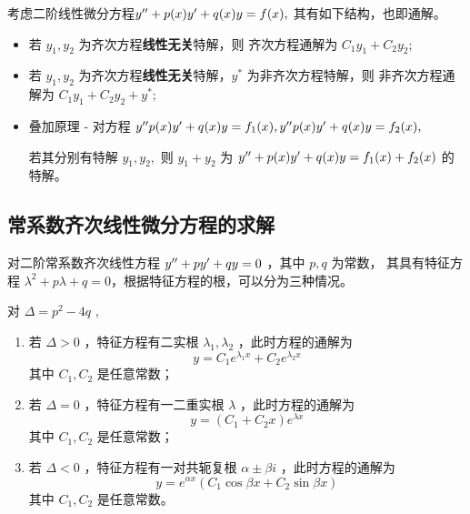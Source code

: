 考虑二阶线性微分方程$ y^{\prime\prime} + p(x)y' + q(x)y = f(x), $ 其有如下结构，也即通解。

\begin{itemize}
    \item 若 $ y_1,y_2 $ 为齐次方程\textbf{线性无关}特解，则
    齐次方程通解为 $ C_1y_1+C_2y_2; $ 
    \item 若 $ y_1,y_2 $ 为齐次方程\textbf{线性无关}特解，$ y^* $ 为非齐次方程特解，则
    非齐次方程通解为 $ C_1y_1+C_2y_2 + y^*; $ 
    \item 叠加原理 - 对方程 $ y^{\prime\prime} p(x)y'+q(x)y = f_1(x),y^{\prime\prime} p(x)y'+q(x)y = f_2(x), $
    
    若其分别有特解 $ y_1,y_2, $ 则 $ y_1+y_2 $ 为 $ y^{\prime\prime} +p(x)y'+q(x)y = f_1(x)+f_2(x) $ 的特解。
\end{itemize}

\begin{comment}
\begin{itemize}
    \item 对二阶齐次线性微分方程的两特解 $ y_1,y_2 $ ，其任意一组线性组合都是
    同一方程的特解；若两特解线性无关，其线性组合为通解；
    \item 若 $ y_1,y_2 $ 为二阶非齐次线性微分方程的两特解，
    则 $ y_1-y_2 $ 是对应齐次方程的一特解；
    \item 若 $ \hat y,y^* $ 分别为一二阶齐次线性微分方程以及与前者
    对应的非齐次方程的特解，则其和为对应非齐次方程的一特解；
    \item 若 $ \hat y,y^* $ 分别为一二阶齐次线性微分方程的通解以及与前者
    对应的非齐次方程的特解，则其和为对应非齐次方程的通解；
    \item 对方程 $ y^\pprime p_1(x)y'+p_0(x)y = f_1(x),y^\pprime p_1(x)y'+p_0(x)y = f_2(x) $
    ，若其分别有特解 $ y_1,y_2, $ 则 $ y_1+y_2 $ 为 $ y^\pprime p_1(x)y'+p_0(x)y = f_1(x)+f_2(x) $ 的特解。
\end{itemize}    
\end{comment}

\subsection{常系数齐次线性微分方程的求解}

对二阶常系数齐次线性方程 $ y^{\prime\prime} +py'+qy = 0 $ ，其中 $ p,q $ 为常数，
其具有特征方程 $ \lambda^2+p\lambda+q = 0 $，根据特征方程的根，可以分为三种情况。

对 $ \Delta = p^2 - 4q $ ,
\begin{enumerate}
    \item 若 $ \Delta > 0 $ ，特征方程有二实根 $ \lambda_1,\lambda_2 $ ，此时方程的通解为$$
        y = C_1e^{\lambda_1x}+C_2e^{\lambda_2x}
    $$ 其中 $ C_1,C_2 $ 是任意常数；
    \item 若 $ \Delta = 0 $ ，特征方程有一二重实根 $ \lambda $ ，此时方程的通解为$$
        y = (C_1+C_2 x)e^{\lambda x}
    $$ 其中 $ C_1,C_2 $ 是任意常数；
    \item 若 $ \Delta < 0 $ ，特征方程有一对共轭复根 $ \alpha\pm\beta i $ ，此时方程的通解为$$
        y = e^{\alpha x}\left(C_1\cos \beta x + C_2 \sin \beta x\right)
    $$ 其中 $ C_1,C_2 $ 是任意常数。
\end{enumerate}

